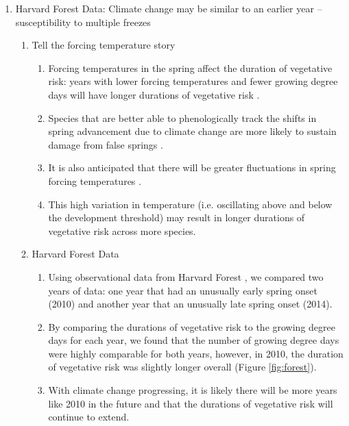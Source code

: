 \documentclass{article}\usepackage[]{graphicx}\usepackage[]{color}
\begin{document}
\begin{enumerate}
\item Harvard Forest Data: Climate change may be similar to an earlier year -- susceptibility to multiple freezes 
\begin{enumerate}
\item Tell the forcing temperature story
\begin{enumerate}
\item Forcing temperatures in the spring affect the duration of vegetative risk: years with lower forcing temperatures and fewer growing degree days will have longer durations of vegetative risk \citep{Donnelly2017}.
\item Species that are better able to phenologically track the shifts in spring advancement due to climate change are more likely to sustain damage from false springs \citep{Scheifinger2003}.
\item It is also anticipated that there will be greater fluctuations in spring forcing temperatures \citep{Martin2010}.
\item This high variation in temperature (i.e. oscillating above and below the development threshold) may result in longer durations of vegetative risk across more species.
\end{enumerate}
\item Harvard Forest Data
\begin{enumerate}
\item Using observational data from Harvard Forest \citep{Okeefe2014}, we compared two years of data: one year that had an unusually early spring onset (2010) and another year that an unusually late spring onset (2014).
\item By comparing the durations of vegetative risk to the growing degree days for each year, we found that the number of growing degree days were highly comparable for both years, however, in 2010, the duration of vegetative risk was slightly longer overall (Figure \ref{fig:forest}). 
\item With climate change progressing, it is likely there will be more years like 2010 in the future and that the durations of vegetative risk will continue to extend. %
\end{enumerate}
\end{enumerate}



\end{enumerate}
\end{document}
